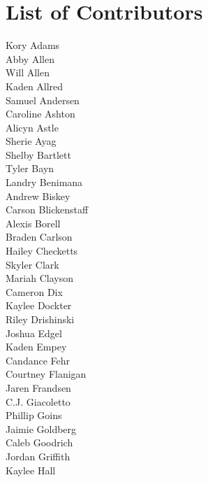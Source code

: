 \section*{List of Contributors}
\begin{multicols}{5}
\noindent 
{\footnotesize
Kory Adams\\
Abby Allen\\
Will Allen\\
Kaden Allred\\
Samuel Andersen\\
Caroline Ashton\\
Alicyn Astle\\
Sherie Ayag\\
Shelby Bartlett\\
Tyler Bayn\\
Landry Benimana\\
Andrew Biskey\\
Carson Blickenstaff\\
Alexis Borell\\
Braden Carlson\\
Hailey Checketts\\
Skyler Clark\\
Mariah Clayson\\
Cameron Dix\\
Kaylee Dockter\\
Riley Drishinski\\
Joshua Edgel\\
Kaden Empey\\
Candance Fehr\\
Courtney Flanigan\\
Jaren Frandsen\\
C.J. Giacoletto\\
Phillip Goins\\
Jaimie Goldberg\\
Caleb Goodrich\\
Jordan Griffith\\
Kaylee Hall\\
}
\end{multicols}
